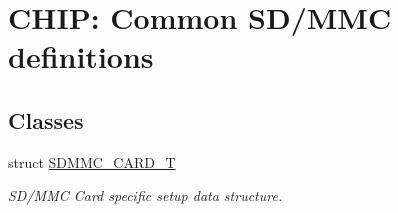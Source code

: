 \hypertarget{group___c_h_i_p___s_d_m_m_c___definitions}{}\section{C\+H\+IP\+: Common S\+D/\+M\+MC definitions}
\label{group___c_h_i_p___s_d_m_m_c___definitions}
\subsection*{Classes}
\begin{DoxyCompactItemize}
\item 
struct \hyperlink{struct_s_d_m_m_c___c_a_r_d___t}{S\+D\+M\+M\+C\+\_\+\+C\+A\+R\+D\+\_\+T}
\begin{DoxyCompactList}\small\item\em S\+D/\+M\+MC Card specific setup data structure. \end{DoxyCompactList}\end{DoxyCompactItemize}

